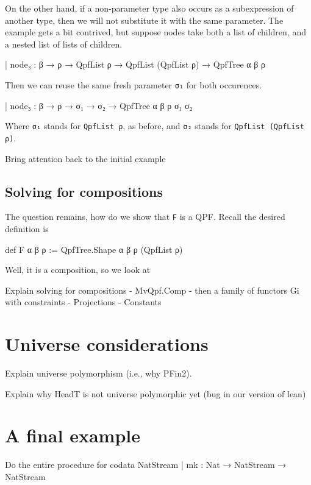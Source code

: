 \documentclass[titlepage]{report}
\newenvironment{todo}[1][Todo:]{\begin{trivlist}                         
    \item[\hskip \labelsep {\bfseries #1}]}{\end{trivlist}}
\begin{document}
On the other hand, if a non-parameter type also occurs as a subexpression of another type, then
we will not substitute it with the same parameter.
The example gets a bit contrived, but suppose nodes take both a list of children, and a nested list 
of lists of children.
\begin{leancode}
    | node₃ : β → ρ → QpfList ρ → QpfList (QpfList ρ) → QpfTree α β ρ
\end{leancode}
Then we can reuse the same fresh parameter \texttt{σ₁} for both occurences.
\begin{leancode}
    | node₃ : β → ρ → σ₁ → σ₂ → QpfTree α β ρ σ₁ σ₂
\end{leancode}
Where \texttt{σ₁} stands for \texttt{QpfList ρ}, as before, and \texttt{σ₂} stands for 
\texttt{QpfList (QpfList ρ)}.

\begin{todo}
    Bring attention back to the initial example
\end{todo}


\subsection{Solving for compositions}

The question remains, how do we show that \texttt{F} is a QPF.
Recall the desired definition is
\begin{leancode}
    def F α β ρ := QpfTree.Shape α β ρ (QpfList ρ)
\end{leancode}

Well, it is a composition, so we look at 

\begin{todo}
    Explain solving for compositions
    - MvQpf.Comp
    - then a family of functors Gi with constraints
    - Projections
    - Constants
\end{todo}




\section{Universe considerations}
\begin{todo}
    Explain universe polymorphism (i.e., why PFin2).

    Explain why HeadT is not universe polymorphic yet (bug in our version of lean)
\end{todo}


\section{A final example}
\begin{todo}
    Do the entire procedure for
    codata NatStream
    | mk : Nat → NatStream → NatStream
\end{todo}
\end{document}

